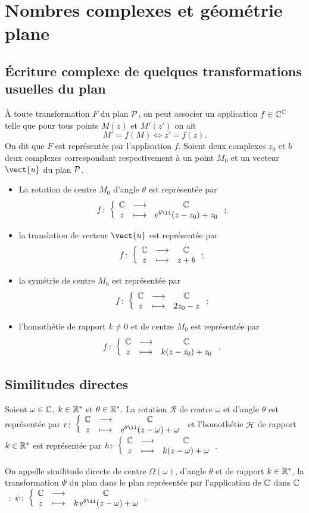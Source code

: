 \section{Nombres complexes et géométrie plane}
\label{sec:complexesetgeometrie}
\subsection{Écriture complexe de quelques transformations usuelles du plan}
\label{subsec:ecriturecomplexeettransformations}
À toute transformation $F$ du plan $\P$, on peut associer un application $f \in \C^{\C}$ telle que pour tous points $M(z)$ et $M'(z')$ on ait
\begin{equation}
  M'=f(M) \iff z'=f(z).
\end{equation}
On dit que $F$ est représentée par l'application $f$. Soient deux complexes $z_0$ et $b$ deux complexes correspondant respectivement à un point $M_0$ et un vecteur $\vect{u}$ du plan $\P$.
\begin{itemize}
\item La rotation de centre $M_0$ d'angle $\theta$ est représentée par
  \begin{equation}
    \fonction{f}{\C}{\C}{z}{\expc{}{\theta}(z-z_0) +z_0};
  \end{equation}
\item la translation de vecteur $\vect{u}$ est représentée par
  \begin{equation}
    \fonction{f}{\C}{\C}{z}{z+b};
  \end{equation}
\item la symétrie de centre $M_0$ est représentée par
  \begin{equation}
    \fonction{f}{\C}{\C}{z}{2z_0-z};
  \end{equation}
\item l'homothétie de rapport $k\neq 0$ et de centre $M_0$ est représentée par
  \begin{equation}
    \fonction{f}{\C}{\C}{z}{k(z-z_0)+z_0}.
  \end{equation}
\end{itemize}
%
\subsection{Similitudes directes}
\label{subsec:simdirecte}
Soient $\omega \in \C$, $k\in \R^*$ et $\theta \in \R^*$. La rotation $\mathcal{R}$ de centre $\omega$ et d'angle $\theta$ est représentée par $\fonction{r}{\C}{\C}{z}{\expc{}{\theta}(z-\omega)+\omega}$ et l'homothétie $\mathcal{H}$ de rapport $k \in \R^*$ est représentée par $\fonction{h}{\C}{\C}{z}{k(z-\omega)+\omega}$.
%
\begin{defdef}
  On appelle similitude directe de centre $\Omega(\omega)$, d'angle $\theta$ et de rapport $k \in \R^*$, la transformation $\Psi$ du plan dans le plan représentée par l'application de $\C$ dans $\C$~: $\fonction{\psi}{\C}{\C}{z}{\expc{k}{\theta}(z-\omega)+\omega}$.
\end{defdef}

